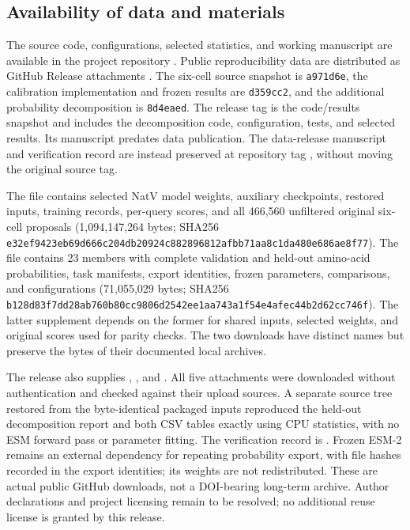 \documentclass[referee,pdflatex,sn-vancouver-num]{sn-jnl}
\begin{document}
\subsection*{Availability of data and materials}
The source code, configurations, selected statistics, and working manuscript are available in the project repository \cite{natvrepo}. Public reproducibility data are distributed as GitHub Release attachments \cite{natvdata}. The six-cell source snapshot is \texttt{a971d6e}, the calibration implementation and frozen results are \texttt{d359cc2}, and the additional probability decomposition is \texttt{8d4eaed}. The release tag is the code/results snapshot and includes the decomposition code, configuration, tests, and selected results. Its manuscript predates data publication. The data-release manuscript and verification record are instead preserved at repository tag , without moving the original source tag.

The file  contains selected NatV model weights, auxiliary checkpoints, restored inputs, training records, per-query scores, and all 466,560 unfiltered original six-cell proposals (1,094,147,264 bytes; SHA256 \texttt{e32ef9423eb69d666c204db20924c882896\allowbreak 812afbb71aa8c1da480e686ae8f77}). The file  contains 23 members with complete validation and held-out amino-acid probabilities, task manifests, export identities, frozen parameters, comparisons, and configurations (71,055,029 bytes; SHA256 \texttt{b128d83f7dd28ab760b80cc9806d2542ee\allowbreak 1aa743a1f54e4afec44b2d62cc746f}). The latter supplement depends on the former for shared inputs, selected weights, and original scores used for parity checks. The two downloads have distinct names but preserve the bytes of their documented local  archives.

The release also supplies , , and . All five attachments were downloaded without authentication and checked against their upload sources. A separate source tree restored from the byte-identical packaged inputs reproduced the held-out decomposition report and both CSV tables exactly using CPU statistics, with no ESM forward pass or parameter fitting. The verification record is . Frozen ESM-2 remains an external dependency for repeating probability export, with file hashes recorded in the export identities; its weights are not redistributed. These are actual public GitHub downloads, not a DOI-bearing long-term archive. Author declarations and project licensing remain to be resolved; no additional reuse license is granted by this release.
\end{document}
